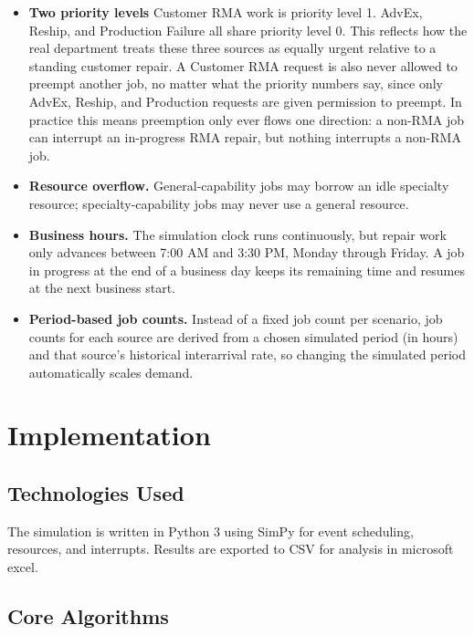 \documentclass[12pt, letterpaper, twoside]{article}
\begin{document}
\begin{itemize}
    \item \textbf{Two priority levels} Customer RMA work is priority level
    1. AdvEx, Reship, and Production Failure all share priority level 0. This reflects how
    the real department treats these three sources as equally urgent relative to a
    standing customer repair. A Customer RMA request is also never allowed to preempt
    another job, no matter what the priority numbers say, since only AdvEx, Reship, and
    Production requests are given permission to preempt. In practice this means
    preemption only ever flows one direction: a non-RMA job can interrupt an in-progress
    RMA repair, but nothing interrupts a non-RMA job.
    \item \textbf{Resource overflow.} General-capability jobs may borrow
    an idle specialty resource; specialty-capability jobs may never use a general
    resource.
    \item \textbf{Business hours.} The simulation clock runs continuously, but repair work
    only advances between 7:00 AM and 3:30 PM, Monday through Friday. A job in progress at
    the end of a business day keeps its remaining time and resumes at the next business
    start.
    \item \textbf{Period-based job counts.} Instead of a fixed job count per scenario, job
    counts for each source are derived from a chosen simulated period (in hours) and that
    source's historical interarrival rate, so changing the simulated period automatically
    scales demand.
\end{itemize}

\section{Implementation}
\label{sec:implementation}

\subsection{Technologies Used}

The simulation is written in Python 3 using SimPy for event scheduling,
resources, and interrupts. Results are exported to CSV for analysis in microsoft excel.

\subsection{Core Algorithms}
\end{document}
